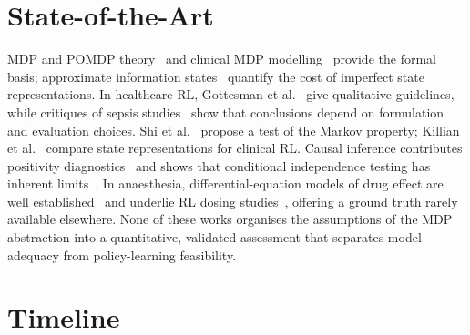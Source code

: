 \documentclass[runningheads]{llncs}
\begin{document}
\section{State-of-the-Art}
MDP and POMDP theory~\cite{Puterman1994,Kaelbling1998} and clinical MDP modelling~\cite{Steimle2017} provide the formal basis; approximate information states~\cite{Subramanian2022} quantify the cost of imperfect state representations. In healthcare RL, Gottesman et al.~\cite{Gottesman2019} give qualitative guidelines, while critiques of sepsis studies~\cite{Jeter2019,Luo2024} show that conclusions depend on formulation and evaluation choices. Shi et al.~\cite{Shi2020} propose a test of the Markov property; Killian et al.~\cite{Killian2020} compare state representations for clinical RL. Causal inference contributes positivity diagnostics~\cite{Petersen2012} and shows that conditional independence testing has inherent limits~\cite{Shah2020}. In anaesthesia, differential-equation models of drug effect are well established~\cite{Schnider1998,Eleveld2018} and underlie RL dosing studies~\cite{Schamberg2022}, offering a ground truth rarely available elsewhere. None of these works organises the assumptions of the MDP abstraction into a quantitative, validated assessment that separates model adequacy from policy-learning feasibility.


\section{Timeline}
\end{document}
